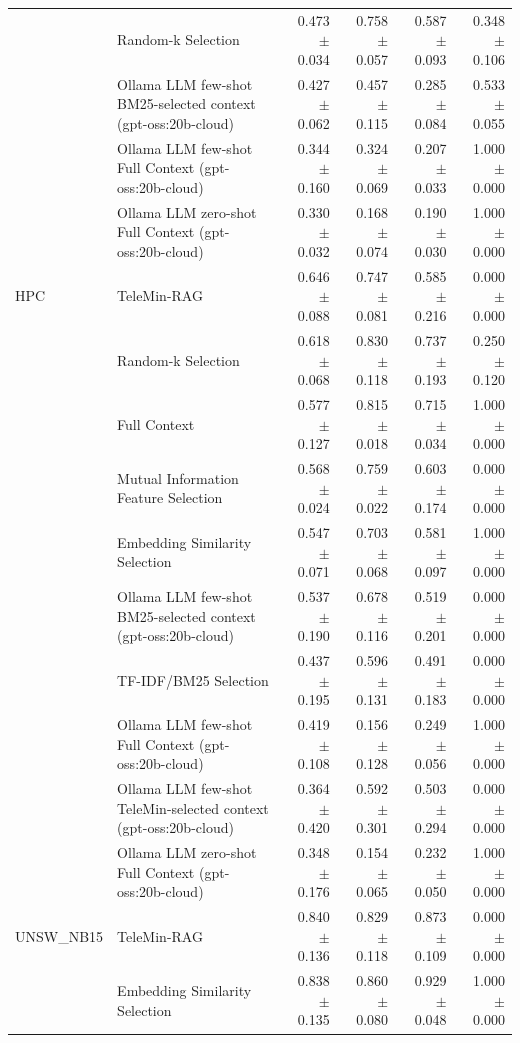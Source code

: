 \begin{tabular}{llrrrr}
 & Random-k Selection & 0.473 $\pm$ 0.034 & 0.758 $\pm$ 0.057 & 0.587 $\pm$ 0.093 & 0.348 $\pm$ 0.106 \\
 & Ollama LLM few-shot BM25-selected context (gpt-oss:20b-cloud) & 0.427 $\pm$ 0.062 & 0.457 $\pm$ 0.115 & 0.285 $\pm$ 0.084 & 0.533 $\pm$ 0.055 \\
 & Ollama LLM few-shot Full Context (gpt-oss:20b-cloud) & 0.344 $\pm$ 0.160 & 0.324 $\pm$ 0.069 & 0.207 $\pm$ 0.033 & 1.000 $\pm$ 0.000 \\
 & Ollama LLM zero-shot Full Context (gpt-oss:20b-cloud) & 0.330 $\pm$ 0.032 & 0.168 $\pm$ 0.074 & 0.190 $\pm$ 0.030 & 1.000 $\pm$ 0.000 \\
\midrule
HPC & TeleMin-RAG & 0.646 $\pm$ 0.088 & 0.747 $\pm$ 0.081 & 0.585 $\pm$ 0.216 & 0.000 $\pm$ 0.000 \\
 & Random-k Selection & 0.618 $\pm$ 0.068 & 0.830 $\pm$ 0.118 & 0.737 $\pm$ 0.193 & 0.250 $\pm$ 0.120 \\
 & Full Context & 0.577 $\pm$ 0.127 & 0.815 $\pm$ 0.018 & 0.715 $\pm$ 0.034 & 1.000 $\pm$ 0.000 \\
 & Mutual Information Feature Selection & 0.568 $\pm$ 0.024 & 0.759 $\pm$ 0.022 & 0.603 $\pm$ 0.174 & 0.000 $\pm$ 0.000 \\
 & Embedding Similarity Selection & 0.547 $\pm$ 0.071 & 0.703 $\pm$ 0.068 & 0.581 $\pm$ 0.097 & 1.000 $\pm$ 0.000 \\
 & Ollama LLM few-shot BM25-selected context (gpt-oss:20b-cloud) & 0.537 $\pm$ 0.190 & 0.678 $\pm$ 0.116 & 0.519 $\pm$ 0.201 & 0.000 $\pm$ 0.000 \\
 & TF-IDF/BM25 Selection & 0.437 $\pm$ 0.195 & 0.596 $\pm$ 0.131 & 0.491 $\pm$ 0.183 & 0.000 $\pm$ 0.000 \\
 & Ollama LLM few-shot Full Context (gpt-oss:20b-cloud) & 0.419 $\pm$ 0.108 & 0.156 $\pm$ 0.128 & 0.249 $\pm$ 0.056 & 1.000 $\pm$ 0.000 \\
 & Ollama LLM few-shot TeleMin-selected context (gpt-oss:20b-cloud) & 0.364 $\pm$ 0.420 & 0.592 $\pm$ 0.301 & 0.503 $\pm$ 0.294 & 0.000 $\pm$ 0.000 \\
 & Ollama LLM zero-shot Full Context (gpt-oss:20b-cloud) & 0.348 $\pm$ 0.176 & 0.154 $\pm$ 0.065 & 0.232 $\pm$ 0.050 & 1.000 $\pm$ 0.000 \\
\midrule
UNSW_NB15 & TeleMin-RAG & 0.840 $\pm$ 0.136 & 0.829 $\pm$ 0.118 & 0.873 $\pm$ 0.109 & 0.000 $\pm$ 0.000 \\
 & Embedding Similarity Selection & 0.838 $\pm$ 0.135 & 0.860 $\pm$ 0.080 & 0.929 $\pm$ 0.048 & 1.000 $\pm$ 0.000 \\

\end{tabular}
